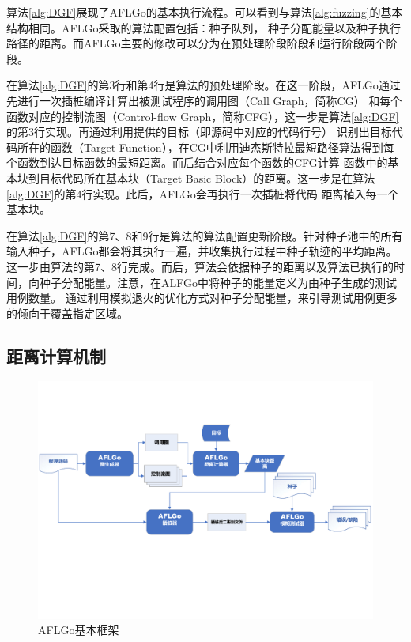 \documentclass[bachelor]{njupthesis}
\begin{document}
算法\ref{alg:DGF}展现了AFLGo的基本执行流程。可以看到与算法\ref{alg:fuzzing}的基本结构相同。AFLGo采取的算法配置包括：种子队列，
种子分配能量以及种子执行路径的距离。而AFLGo主要的修改可以分为在预处理阶段阶段和运行阶段两个阶段。

在算法\ref{alg:DGF}的第3行和第4行是算法的预处理阶段。在这一阶段，AFLGo通过先进行一次插桩编译计算出被测试程序的调用图（Call Graph，简称CG）
和每个函数对应的控制流图（Control-flow Graph，简称CFG），这一步是算法\ref{alg:DGF}的第3行实现。再通过利用提供的目标（即源码中对应的代码行号）
识别出目标代码所在的函数（Target Function），在CG中利用迪杰斯特拉最短路径算法得到每个函数到达目标函数的最短距离。而后结合对应每个函数的CFG计算
函数中的基本块到目标代码所在基本块（Target Basic Block）的距离。这一步是在算法\ref{alg:DGF}的第4行实现。此后，AFLGo会再执行一次插桩将代码
距离植入每一个基本块。

在算法\ref{alg:DGF}的第7、8和9行是算法的算法配置更新阶段。针对种子池中的所有输入种子，AFLGo都会将其执行一遍，并收集执行过程中种子轨迹的平均距离。
这一步由算法的第7、8行完成。而后，算法会依据种子的距离以及算法已执行的时间，向种子分配能量。注意，在ALFGo中将种子的能量定义为由种子生成的测试用例数量。
通过利用模拟退火的优化方式对种子分配能量，来引导测试用例更多的倾向于覆盖指定区域。
\subsection{距离计算机制}
\begin{figure}[htbp]
	\centering
	\includegraphics[width=1\textwidth]{pic/AFLGo.pdf}
	\caption{AFLGo基本框架}
 	\label{pic:AFLGo}
\end{figure}
\end{document}
